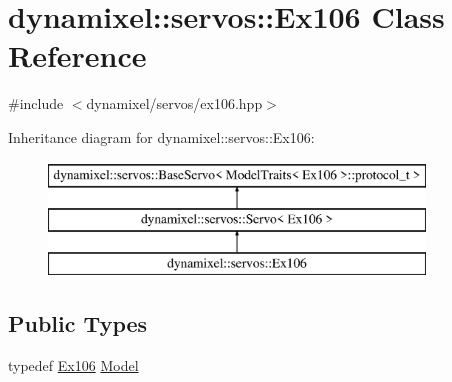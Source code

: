 \hypertarget{classdynamixel_1_1servos_1_1_ex106}{}\section{dynamixel\+:\+:servos\+:\+:Ex106 Class Reference}
\label{classdynamixel_1_1servos_1_1_ex106}


{\ttfamily \#include $<$dynamixel/servos/ex106.\+hpp$>$}

Inheritance diagram for dynamixel\+:\+:servos\+:\+:Ex106\+:\begin{figure}[H]
\begin{center}
\leavevmode
\includegraphics[height=3.000000cm]{classdynamixel_1_1servos_1_1_ex106}
\end{center}
\end{figure}
\subsection*{Public Types}
\begin{DoxyCompactItemize}
\item 
typedef \hyperlink{classdynamixel_1_1servos_1_1_ex106}{Ex106} \hyperlink{classdynamixel_1_1servos_1_1_ex106_a82a4328e82ded805df0615ea61fc2458}{Model}
\end{DoxyCompactItemize}
